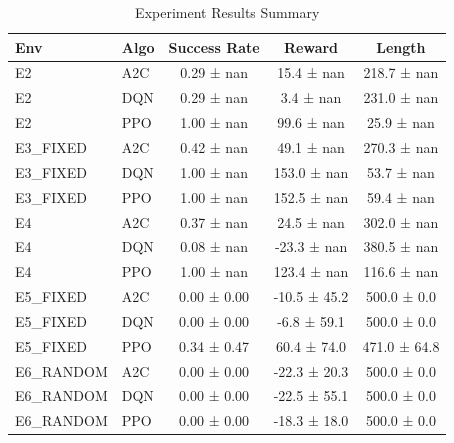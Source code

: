 \begin{table}[h]
\centering
\caption{Experiment Results Summary}
\begin{tabular}{llccc}
\toprule
Env & Algo & Success Rate & Reward & Length \\
\midrule
E2 & A2C & 0.29 ± nan & 15.4 ± nan & 218.7 ± nan \\
E2 & DQN & 0.29 ± nan & 3.4 ± nan & 231.0 ± nan \\
E2 & PPO & 1.00 ± nan & 99.6 ± nan & 25.9 ± nan \\
E3_FIXED & A2C & 0.42 ± nan & 49.1 ± nan & 270.3 ± nan \\
E3_FIXED & DQN & 1.00 ± nan & 153.0 ± nan & 53.7 ± nan \\
E3_FIXED & PPO & 1.00 ± nan & 152.5 ± nan & 59.4 ± nan \\
E4 & A2C & 0.37 ± nan & 24.5 ± nan & 302.0 ± nan \\
E4 & DQN & 0.08 ± nan & -23.3 ± nan & 380.5 ± nan \\
E4 & PPO & 1.00 ± nan & 123.4 ± nan & 116.6 ± nan \\
E5_FIXED & A2C & 0.00 ± 0.00 & -10.5 ± 45.2 & 500.0 ± 0.0 \\
E5_FIXED & DQN & 0.00 ± 0.00 & -6.8 ± 59.1 & 500.0 ± 0.0 \\
E5_FIXED & PPO & 0.34 ± 0.47 & 60.4 ± 74.0 & 471.0 ± 64.8 \\
E6_RANDOM & A2C & 0.00 ± 0.00 & -22.3 ± 20.3 & 500.0 ± 0.0 \\
E6_RANDOM & DQN & 0.00 ± 0.00 & -22.5 ± 55.1 & 500.0 ± 0.0 \\
E6_RANDOM & PPO & 0.00 ± 0.00 & -18.3 ± 18.0 & 500.0 ± 0.0 \\
\bottomrule
\end{tabular}
\label{tab:results}
\end{table}
